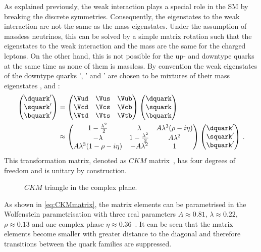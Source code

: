 As explained previously, the weak interaction plays a special role in the \ac{SM} by breaking the discrete symmetries.
Consequently, the eigenstates to the weak interaction are not the same as the mass eigenstates.
Under the assumption of massless neutrinos, this can be solved by a simple matrix rotation such that the eigenstates to the weak interaction and the mass are the same for the charged leptons.
On the other hand, this is not possible for the up- and downtype quarks at the same time as none of them is massless.
By convention the weak eigenstates of the downtype quarks \dquark', \squark' and \bquark' are chosen to be mixtures of their mass eigenstates \dquark, \squark and \bquark:
\begin{align}
\begin{pmatrix} \dquark' \\ \squark' \\ \bquark' \end{pmatrix}
&= \begin{pmatrix} \Vud & \Vus & \Vub \\ \Vcd & \Vcs & \Vcb \\ \Vtd & \Vts & \Vtb \end{pmatrix}
\begin{pmatrix} \dquark \\ \squark \\ \bquark \end{pmatrix}\nonumber \\
&\approx \begin{pmatrix} 1-\frac{\lambda^2}{2} & \lambda & A\lambda^3(\rho-i\eta) \\
                        -\lambda & 1-\frac{\lambda^2}{2} & A\lambda^2 \\
                        A\lambda^3(1-\rho-i\eta) & -A\lambda^2 & 1 \end{pmatrix}
\begin{pmatrix} \dquark' \\ \squark' \\ \bquark' \end{pmatrix}\,. \label{eq:CKMmatrix}
\end{align}
This transformation matrix, denoted as $CKM$ matrix~\cite{Kobayashi:1973fv,PhysRevLett.10.531}, has four degrees of freedom and is unitary by construction.
\begin{figure}[tbp]
	\centering
	
	\caption{$CKM$ triangle in the complex plane.}
	\label{fig:ckmtheory}
\end{figure}
As shown in \cref{eq:CKMmatrix}, the matrix elements can be parametrised in the Wolfenstein parametrisation \cite{Wolfenstein:1983yz} with three real parameters $A\approx0.81$, $\lambda\approx0.22$, $\rho\approx0.13$ \cite{PDG2018} and one complex phase \mbox{$\eta\approx0.36$~\cite{PDG2018}}.
It can be seen that the matrix elements become smaller with greater distance to the diagonal and therefore transitions between the quark families are suppressed.

